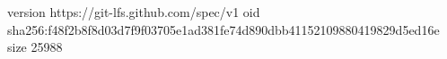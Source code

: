 version https://git-lfs.github.com/spec/v1
oid sha256:f48f2b8f8d03d7f9f03705e1ad381fe74d890dbb41152109880419829d5ed16e
size 25988
